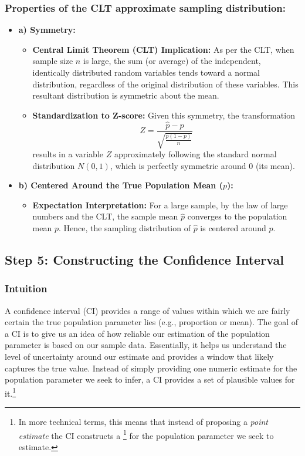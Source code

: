 \documentclass[11pt]{article}
\begin{document}
\subsubsection*{Properties of the CLT approximate sampling distribution:}
\begin{itemize}
    \item \textbf{a) Symmetry:}
        \begin{itemize}
        \item \textbf{Central Limit Theorem (CLT) Implication:} As per the CLT, when sample size \( n \) is large, the sum (or average) of the independent, identically distributed random variables tends toward a normal distribution, regardless of the original distribution of these variables. This resultant distribution is symmetric about the mean.
        \item \textbf{Standardization to Z-score:} Given this symmetry, the transformation
        \[
        Z = \frac{\hat{p} - p}{\sqrt{\frac{p(1-p)}{n}}}
        \]
        results in a variable \( Z \) approximately following the standard normal distribution \( N(0,1) \), which is perfectly symmetric around 0 (its mean).
        \end{itemize}
    \item \textbf{b) Centered Around the True Population Mean (\( p \)):}
        \begin{itemize}
          \item \textbf{Expectation Interpretation:} For a large sample, by the law of large numbers and the CLT, the sample mean \( \hat{p} \) converges to the population mean \( p \). Hence, the sampling distribution of \( \hat{p} \) is centered around \( p \).
        \end{itemize}
\end{itemize}

\subsection*{Step 5: Constructing the Confidence Interval}

\subsubsection*{Intuition}

A confidence interval (CI) provides a range of values within which we are fairly certain the true population parameter lies (e.g., proportion or mean). The goal of a CI is to give us an idea of how reliable our estimation of the population parameter is based on our sample data. Essentially, it helps us understand the level of uncertainty around our estimate and provides a window that likely captures the true value. Instead of simply providing one numeric estimate for the population parameter we seek to infer, a CI provides a set of plausible values for it.\footnote{In more technical terms, this means that instead of proposing a \emph{point estimate} the CI constructs a \footnote{set estimate} for the population parameter we seek to estimate.}
\end{document}
